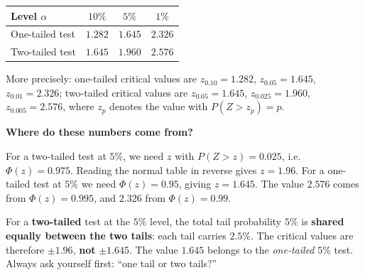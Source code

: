 \documentclass[11pt]{article}
\begin{document}
\begin{propriete}
\begin{center}
\begin{tabular}{|l|c|c|c|}
\hline
\rowcolor{popblueL} Level $\alpha$ & $10\%$ & $5\%$ & $1\%$ \\
\hline
One-tailed test & $1.282$ & $1.645$ & $2.326$ \\
\hline
Two-tailed test & $1.645$ & $1.960$ & $2.576$ \\
\hline
\end{tabular}
\end{center}
More precisely: one-tailed critical values are $z_{0.10} = 1.282$, $z_{0.05} = 1.645$, $z_{0.01} = 2.326$; two-tailed critical values are $z_{0.05} = 1.645$, $z_{0.025} = 1.960$, $z_{0.005} = 2.576$, where $z_p$ denotes the value with $P(Z > z_p) = p$.
\end{propriete}

\textbf{Where do these numbers come from?}\par
For a two-tailed test at $5\%$, we need $z$ with $P(Z > z) = 0.025$, i.e.\ $\Phi(z) = 0.975$. Reading the normal table in reverse gives $z = 1.96$. For a one-tailed test at $5\%$ we need $\Phi(z) = 0.95$, giving $z = 1.645$. The value $2.576$ comes from $\Phi(z) = 0.995$, and $2.326$ from $\Phi(z) = 0.99$.

\begin{attention}
For a \textbf{two-tailed} test at the $5\%$ level, the total tail probability $5\%$ is \textbf{shared equally between the two tails}: each tail carries $2.5\%$. The critical values are therefore $\pm 1.96$, \textbf{not} $\pm 1.645$. The value $1.645$ belongs to the \emph{one-tailed} $5\%$ test. Always ask yourself first: ``one tail or two tails?''
\end{attention}
\end{document}
